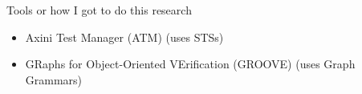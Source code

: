 \documentclass{FMTslides}
\begin{document}
\begin{frame}{Tools or how I got to do this research}
\begin{itemize}
\item Axini Test Manager (ATM) (uses STSs)
\item GRaphs for Object-Oriented VErification (GROOVE) (uses Graph Grammars)
\end{itemize}
\begin{figure}
\centering
  \hspace{10px}
\end{figure}
\end{frame}
\end{document}

